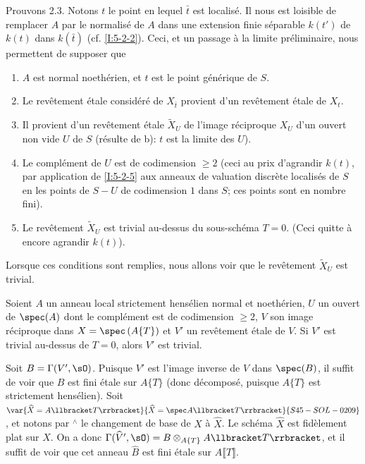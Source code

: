 \begingroup
\renewcommand*{\thesubsubsection}{2.3.3}
\begin{sourcebareinline}\label{I:5-2-6} %
Prouvons 2.3. Notons $t$ le point en lequel $\bar t$ est localisé. Il nous est loisible de 
remplacer $A$ par le normalisé de $A$ dans une extension finie séparable 
$k(t')$ de $k(t)$ dans $k(\bar t)$ (cf. \ref{I:5-2-2}). Ceci, et un passage à 
la limite préliminaire, nous permettent de supposer que 
\begin{enumerate}[\indent a)]
  \item $A$ est normal noethérien, et $t$ est le point générique de $S$.
  \item Le revêtement étale considéré de $X_{\bar t}$ provient d'un 
    revêtement étale de $X_t$. 
  \item Il provient d'un revêtement étale $\widetilde X_U$ de l'image 
    réciproque $X_U$ d'un ouvert non vide $U$ de $S$ (résulte de b): $t$ 
    est la limite des $U$).
  \item Le complément de $U$ est de codimension $\geqslant 2$ (ceci au prix 
    d'agrandir $k(t)$, par application de \ref{I:5-2-5} aux anneaux de 
    valuation discrète localisés de $S$ en les points de $S-U$ de 
    codimension $1$ dans $S$; ces points sont en nombre fini). 
  \item Le revêtement $\widetilde X_U$ est trivial au-dessus du sous-schéma 
    $T=0$. (Ceci quitte à encore agrandir $k(t)$). 
\end{enumerate}
\end{sourcebareinline}
\endgroup

Lorsque ces conditions sont remplies, nous allons voir que le revêtement 
$\widetilde X_U$ est trivial. 





\begingroup
\renewcommand*{\thesubsubsection}{2.3.4}
\begin{lemmadotdash}\label{I:5-2-7} %
Soient $A$ un anneau local strictement hensélien normal et noethérien, $U$ 
un ouvert de $\spec(A)$ dont le complément est de codimension $\geqslant 2$, 
$V$ son image réciproque dans $X=\spec\left(A\{T\}\right)$ et $V'$ un 
revêtement étale de $V$. Si $V'$ est trivial au-dessus de $T=0$, alors $V'$ 
est trivial. 
\end{lemmadotdash}
\endgroup

Soit $B=\Gamma(V',\sO)$. Puisque $V'$ est l'image inverse de $V$ dans 
$\spec(B)$, il suffit de voir que $B$ est fini étale sur $A\{T\}$ (donc 
décomposé, puisque $A\{T\}$ est strictement hensélien). Soit 
$\var{\widehat X=A\llbracket T\rrbracket}{\widehat X=\spec A\llbracket T\rrbracket}{S45-SOL-0209}$, et notons par ${}^\wedge$ le changement 
de base de $X$ à $\widehat X$. Le schéma $\widehat X$ est fidèlement plat 
sur $X$. On a donc 
$\Gamma(\widehat V',\sO) = B\otimes_{A\{T\}} A\llbracket T\rrbracket$, et il 
suffit de voir que cet anneau $\widehat B$ est fini étale sur 
$A\llbracket T\rrbracket$. 

